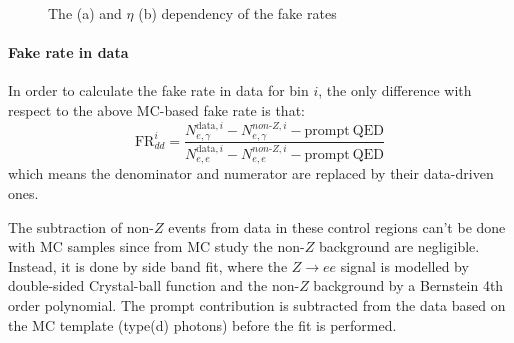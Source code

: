 \begin{figure}[!htbp]
\centering
{}
\caption [] {The \pt (a) and $\eta$ (b) dependency of the fake rates}
\label{fig:egammafake_fr_diff}
\end{figure}   
\FloatBarrier

\paragraph*{Fake rate in data}
In order to calculate the fake rate in data for bin $i$, the only difference with respect to the above MC-based fake rate is that:
\begin{equation}
\text{FR}_{dd}^i = \frac{N_{e,\gamma}^{\mathrm{data},i} - N_{e,\gamma}^{non\text{-}Z,i} - \mathrm{prompt\ QED}}{N_{e,e}^{\mathrm{data},i} - N_{e,e}^{non\text{-}Z,i} - \mathrm{prompt\ QED}}
\end{equation}
which means the denominator and numerator are replaced by their data-driven ones. 

The subtraction of non-$Z$ events from data in these control regions can't be done with MC samples since from MC study the non-$Z$ background are negligible.
Instead, it is done by side band fit,
where the $Z\to ee$ signal is modelled by double-sided Crystal-ball function and the non-$Z$ background by a Bernstein 4th order polynomial. The prompt contribution is subtracted from the data based on the MC template (type(d) photons) before the fit is performed.

